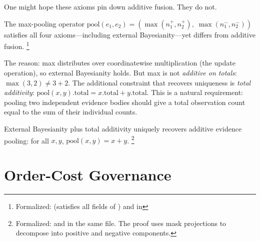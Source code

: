 \documentclass[11pt,openany]{report}
\begin{document}
\noindent
One might hope these axioms pin down additive fusion.  They do not.

\begin{theorem}
\label{thm:pooling-non-unique}
The max-pooling operator
$\mathrm{pool}(e_1, e_2) = (\max(n_1^+, n_2^+),\; \max(n_1^-, n_2^-))$
satisfies all four axioms---including external
Bayesianity---yet differs from additive fusion.%
\footnote{Formalized:
 (satisfies all fields of
) and
 in
}
\end{theorem}

\noindent
The reason: max distributes over coordinatewise multiplication
(the update operation), so external Bayesianity holds.  But max is
not \emph{additive on totals}: $\max(3, 2) \ne 3 + 2$.  The
additional constraint that recovers uniqueness is
\emph{total additivity}:
$\mathrm{pool}(x, y).\mathrm{total} =
x.\mathrm{total} + y.\mathrm{total}$.
This is a natural requirement: pooling two independent evidence
bodies should give a total observation count equal to the sum of
their individual counts.

\begin{theorem}
\label{thm:pooling-unique}
External Bayesianity plus total additivity uniquely recovers
additive evidence pooling: for all $x, y$,
$\mathrm{pool}(x, y) = x + y$.%
\footnote{Formalized:
 and
in the same file.  The proof uses mask projections to decompose
into positive and negative components.}
\end{theorem}



\section{Order-Cost Governance}
\label{sec:order-cost}
\end{document}
